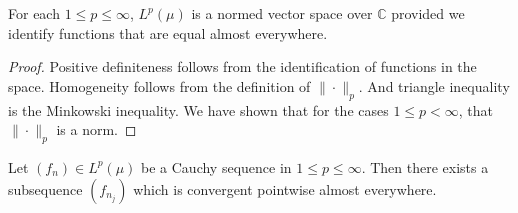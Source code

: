 \begin{theorem}
  For each $1 \le p \le \infty$, $L^p(\mu)$ is a normed vector space
  over $\mathbb{C}$ provided we identify functions that are equal
  almost everywhere.
\end{theorem}
\begin{proof}
  Positive definiteness follows from the identification of functions
  in the space. Homogeneity follows from the definition of
  $\|\cdot\|_p$. And triangle inequality is the Minkowski inequality.
  We have shown that for the cases $1 \le p < \infty$, that
  $\|\cdot\|_p$ is a norm.
\end{proof}

\begin{lemma}
  Let $(f_n) \in L^p( \mu)$ be a Cauchy sequence in $1 \le p \le
  \infty$. Then there exists a subsequence $(f_{n_j})$ which is convergent
  pointwise almost everywhere.
\end{lemma}


